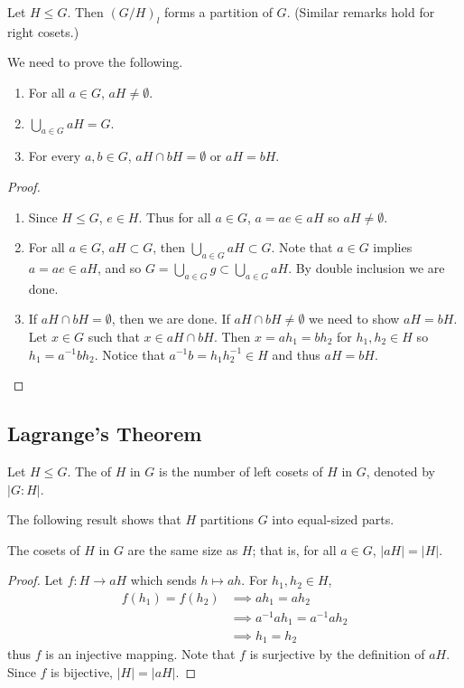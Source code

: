 \begin{proposition}
Let $H\le G$. Then $(G/H)_l$ forms a partition of $G$. (Similar remarks hold for right cosets.)
\end{proposition}

We need to prove the following.
\begin{enumerate}[label=(\roman*)]
\item For all $a\in G$, $aH\neq\emptyset$.
\item $\bigcup_{a\in G}aH=G$.
\item For every $a,b\in G$, $aH\cap bH=\emptyset$ or $aH=bH$.
\end{enumerate}

\begin{proof} \
\begin{enumerate}[label=(\roman*)]
\item Since $H\le G$, $e\in H$. Thus for all $a\in G$, $a=ae\in aH$ so $aH\neq\emptyset$.
\item For all $a\in G$, $aH\subset G$, then $\bigcup_{a\in G}aH\subset G$. Note that $a\in G$ implies $a=ae\in aH$, and so $G=\bigcup_{a\in G}g\subset\bigcup_{a\in G}aH$. By double inclusion we are done.
\item If $aH\cap bH=\emptyset$, then we are done. If $aH\cap bH\neq\emptyset$ we need to show $aH=bH$. Let $x\in G$ such that $x\in aH\cap bH$. Then $x=ah_1=bh_2$ for $h_1,h_2\in H$ so $h_1=a^{-1}bh_2$. Notice that $a^{-1}b=h_1h_2^{-1}\in H$ and thus $aH=bH$.
\end{enumerate}
\end{proof}

\subsection{Lagrange's Theorem}
\begin{definition}[Index]
Let $H\le G$. The  of $H$ in $G$ is the number of left cosets of $H$ in $G$, denoted by $|G:H|$.
\end{definition}

The following result shows that $H$ partitions $G$ into equal-sized parts.

\begin{lemma}
The cosets of $H$ in $G$ are the same size as $H$; that is, for all $a\in G$, $|aH|=|H|$.
\end{lemma}

\begin{proof}
Let $f:H\to aH$ which sends $h\mapsto ah$. For $h_1,h_2\in H$,
\begin{align*}
f(h_1)=f(h_2)
&\implies ah_1=ah_2\\
&\implies a^{-1}ah_1=a^{-1}ah_2\\
&\implies h_1=h_2
\end{align*}
thus $f$ is an injective mapping. Note that $f$ is surjective by the definition of $aH$. Since $f$ is bijective, $|H|=|aH|$.
\end{proof}

